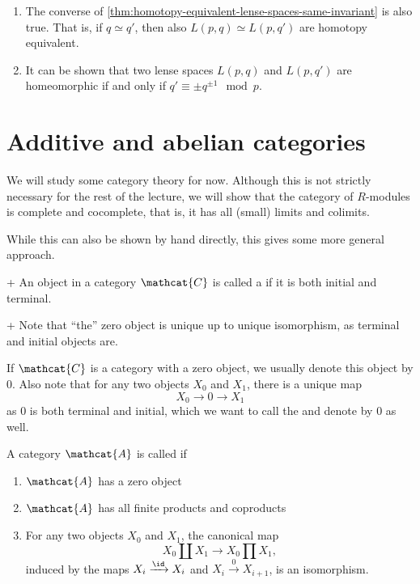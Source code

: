 \begin{remark}
  \begin{enumerate}[1.]
    \item 
      The converse of
      \autoref{thm:homotopy-equivalent-lense-spaces-same-invariant}
      is also true.
      That is, if $q \simeq q'$,
      then also  $L(p,q) \simeq L(p,q')$  are homotopy equivalent.
    \item
      It can be shown that two lense spaces $L(p,q)$ and  $L(p,q')$
      are homeomorphic if and only if  $q' \equiv \pm q^{\pm 1} \mod p$.
  \end{enumerate}
\end{remark}



\section{Additive and abelian categories}

We will study some category theory for now.
Although this is not strictly necessary for the rest of the lecture,
we will show that the category of $R$-modules is complete and cocomplete,
that is, it has all (small) limits and colimits.

While this can also be shown by hand directly,
this gives some more general approach.


\begin{definition}+
  An object in a category $\mathcat{C}$ is called a 
  if it is both initial and terminal.
\end{definition}

\begin{remark}+
  Note that \enquote{the} zero object is unique up to unique isomorphism,
  as terminal and initial objects are.
\end{remark}

\begin{notation}
  If $\mathcat{C}$ is a category with a zero object,
  we usually denote this object by $0$.
  Also note that for any two objects  $X_0$ and $X_1$,
  there is a unique map
  \[
  X_0 \to  0 \to  X_1
  \]
  as $0$ is both terminal and initial,
  which we want to call the  
  and denote by $0$ as well.
\end{notation}


\begin{definition}
  A category $\mathcat{A}$ is called  if
  \begin{enumerate}[p]
    \item $\mathcat{A}$ has a zero object
    \item $\mathcat{A}$ has all finite products and coproducts
    \item For any two objects $X_0$ and $X_1$, the canonical map
      \[
      X_0 \coprod X_1 \to  X_0 \prod X_1
      ,\]
      induced by the maps  $X_i \xrightarrow{\id} X_i$
      and $X_i \xrightarrow{0} X_{i+1}$,
      is an isomorphism.
  \end{enumerate}
\end{definition}

